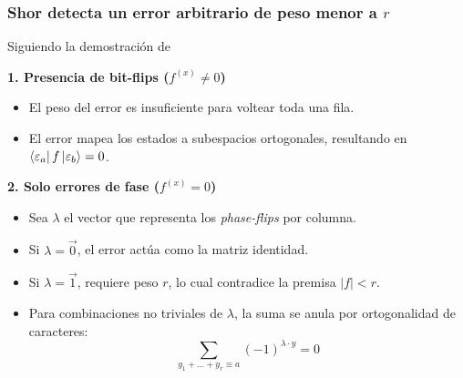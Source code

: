 \begin{frame}
  \frametitle{Shor detecta un error arbitrario de peso menor a $r$}

  Siguiendo la demostración de \cite{Cesar2024}

  \vspace{0.3cm}
  \textbf{1. Presencia de bit-flips ($f^{(x)} \neq 0$)}
  \begin{itemize}
    \item El peso del error es insuficiente para voltear toda una fila.
    \item El error mapea los estados a subespacios ortogonales, resultando en $\bra{\varepsilon_a} f \ket{\varepsilon_b} = 0$.
  \end{itemize}

  \vspace{0.3cm}
  \textbf{2. Solo errores de fase ($f^{(x)} = 0$)}
  \begin{itemize}
    \item Sea $\lambda$ el vector que representa los \textit{phase-flips} por columna.
    \item Si $\lambda = \vec{0}$, el error actúa como la matriz identidad.
    \item Si $\lambda = \vec{1}$, requiere peso $r$, lo cual contradice la premisa $|f| < r$.
    \item Para combinaciones no triviales de $\lambda$, la suma se anula por ortogonalidad de caracteres:
    \begin{equation*}
      \sum_{y_1 + \dots + y_r \equiv a} (-1)^{\lambda \cdot y} = 0
    \end{equation*}
  \end{itemize}
\end{frame}

